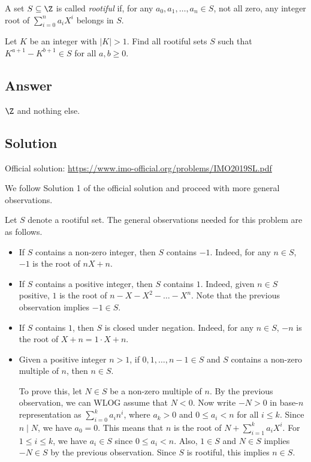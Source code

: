 A set $S \subseteq \Z$ is called \emph{rootiful} if, for any $a_0, a_1, \ldots, a_n \in S$, not all zero, any integer root of $\sum_{i = 0}^n a_i X^i$ belongs in $S$.

Let $K$ be an integer with $|K| > 1$.
Find all rootiful sets $S$ such that $K^{a + 1} - K^{b + 1} \in S$ for all $a, b \geq 0$.



\subsection*{Answer}

$\Z$ and nothing else.



\subsection*{Solution}

Official solution: \url{https://www.imo-official.org/problems/IMO2019SL.pdf}

We follow Solution 1 of the official solution and proceed with more general observations.

Let $S$ denote a rootiful set.
The general observations needed for this problem are as follows.

\begin{itemize}

    \item
    If $S$ contains a non-zero integer, then $S$ contains $-1$.
    Indeed, for any $n \in S$, $-1$ is the root of $nX + n$.

    \item
    If $S$ contains a positive integer, then $S$ contains $1$.
    Indeed, given $n \in S$ positive, $1$ is the root of $n - X - X^2 - \ldots - X^n$.
    Note that the previous observation implies $-1 \in S$.

    \item
    If $S$ contains $1$, then $S$ is closed under negation.
    Indeed, for any $n \in S$, $-n$ is the root of $X + n = 1 \cdot X + n$.

    \item
    Given a positive integer $n > 1$, if $0, 1, \ldots, n - 1 \in S$ and $S$ contains a non-zero multiple of $n$, then $n \in S$.

    To prove this, let $N \in S$ be a non-zero multiple of $n$.
    By the previous observation, we can WLOG assume that $N < 0$.
    Now write $-N > 0$ in base-$n$ representation as $\sum_{i = 0}^k a_i n^i$, where $a_k > 0$ and $0 \leq a_i < n$ for all $i \leq k$.
    Since $n \mid N$, we have $a_0 = 0$.
    This means that $n$ is the root of $N + \sum_{i = 1}^k a_i X^i$.
    For $1 \leq i \leq k$, we have $a_i \in S$ since $0 \leq a_i < n$.
    Also, $1 \in S$ and $N \in S$ implies $-N \in S$ by the previous observation.
    Since $S$ is rootiful, this implies $n \in S$.

\end{itemize}

